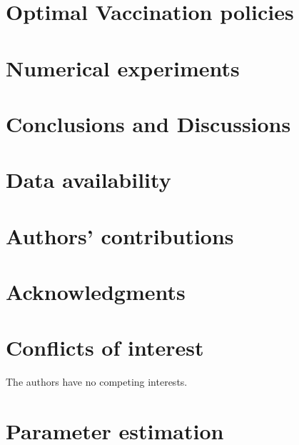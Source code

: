 \documentclass[3p, sort&compress]{elsarticle}
\begin{document}
    \section{Optimal Vaccination policies}
        \label{Sec:OptimalVaccinePolicies}
        
    \section{Numerical experiments}
        \label{Sec:NumericalExperiment}
        
    \section{Conclusions and Discussions}
        
    \section*{Data availability}
        
    \section*{Authors’ contributions}
        
    \section*{Acknowledgments}
        
    \section*{Conflicts of interest}
        The authors have no competing interests.
    
    
    \appendix
    \section{Parameter estimation}
    \label{apx:positivity_invariace}
        
\end{document}
